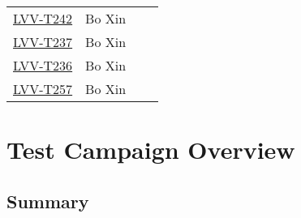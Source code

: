 \documentclass[SE,lsstdraft,STR,toc]{lsstdoc}
\begin{document}
\begin{longtable}{p{3cm}p{3cm}p{3cm}p{6cm}}
\begin{minipage}[]{6cm}
\end{minipage}
\\ \hline
\href{https://jira.lsstcorp.org/secure/Tests.jspa#/testCase/LVV-T242}{LVV-T242}
& {\small Bo Xin } & {\small  } &
\begin{minipage}[]{6cm}
\smallskip
{\small  }
\medskip
\end{minipage}
\\ \hline
\href{https://jira.lsstcorp.org/secure/Tests.jspa#/testCase/LVV-T237}{LVV-T237}
& {\small Bo Xin } & {\small  } &
\begin{minipage}[]{6cm}
\smallskip
{\small  }
\medskip
\end{minipage}
\\ \hline
\href{https://jira.lsstcorp.org/secure/Tests.jspa#/testCase/LVV-T236}{LVV-T236}
& {\small Bo Xin } & {\small  } &
\begin{minipage}[]{6cm}
\smallskip
{\small  }
\medskip
\end{minipage}
\\ \hline
\href{https://jira.lsstcorp.org/secure/Tests.jspa#/testCase/LVV-T257}{LVV-T257}
& {\small Bo Xin } & {\small  } &
\begin{minipage}[]{6cm}
\smallskip
{\small  }
\medskip
\end{minipage}
\\ \hline
\end{longtable}

\newpage

\section{Test Campaign Overview}
\label{sect:overview}

\subsection{Summary}
\label{sect:summarytable}
\end{document}
